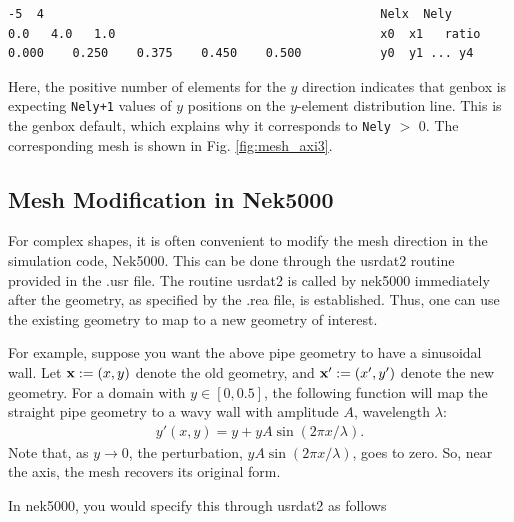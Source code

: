 \begin{verbatim}
-5  4                                               Nelx  Nely
0.0   4.0   1.0                                     x0  x1   ratio
0.000    0.250    0.375    0.450    0.500           y0  y1 ... y4
\end{verbatim}

\noindent
Here, the positive number of elements for the \(y\) direction indicates
that genbox is expecting {\tt Nely+1} values of \(y\) positions on the
\(y\)-element distribution line.   This is the genbox default, which
explains why it corresponds to {\tt Nely} \(>\) 0.  The corresponding mesh
is shown in Fig. \ref{fig:mesh_axi3}.


\subsection{Mesh Modification in Nek5000}

For complex shapes, it is often convenient to modify the mesh
direction in the simulation code, Nek5000.  This can be done
through the usrdat2 routine provided in the .usr file.
The routine usrdat2 is called by nek5000 immediately after
the geometry, as specified by the .rea file, is established.
Thus, one can use the existing geometry to map to a new geometry
of interest.

For example, suppose you want the above pipe geometry to have
a sinusoidal wall.  Let \({\bf x} := (x,y)\) denote the old geometry,
and \({\bf x}' := (x',y')\) denote the new geometry.  For a domain
with \(y\in [0,0.5]\), the following function will map the straight
pipe geometry to a wavy wall with amplitude \(A\), wavelength \(\lambda\):
\begin{eqnarray*}
y'(x,y) = y  + y A \sin( 2 \pi x / \lambda ).
\end{eqnarray*}
Note that, as \(y \longrightarrow 0\), the perturbation, 
\(yA \sin( 2 \pi x / \lambda )\), goes to zero.  So, near the axis,
the mesh recovers its original form.

In nek5000, you would specify this through usrdat2 as follows


